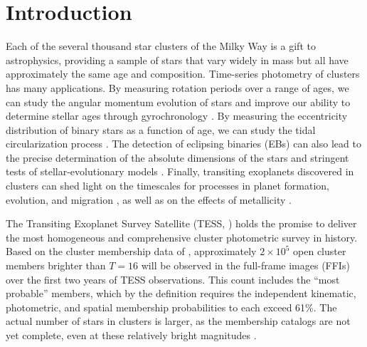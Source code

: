 \documentclass[12pt,twocolumn,tighten]{aastex62}
\begin{document}



\section{Introduction}
\label{sec:intro}

Each of the several thousand star clusters of the Milky Way is a gift
to astrophysics, providing a sample of stars that vary widely in mass
but all have approximately the same age and composition.  Time-series
photometry of clusters has many applications. By measuring rotation
periods over a range of ages, we can study the angular momentum
evolution of stars and improve our ability to determine stellar ages
through gyrochronology \citep[{\it
e.g.},][]{skumanich_time_1972,barnes_color-period_2015,meibom_spin-down_2015,curtis_tess_2019}.
By measuring the eccentricity distribution of binary stars as a
function of age, we can study the tidal circularization process
\citep{meibom_robust_2005,milliman_wiyn_2014,price-whelan_binary_2018}.
The detection of eclipsing binaries (EBs) can also lead to the precise
determination of the absolute dimensions of the stars and stringent
tests of stellar-evolutionary models
\citep{luhman_formation_2012,stassun_review_2014,kraus_mass-radius_2015}.
Finally, transiting exoplanets discovered in clusters can shed light
on the timescales for processes in planet formation, evolution, and
migration
\citep[][]{Fortney_et_al_2007,Mann_K2_33b_2016,David_et_al_2017}, as
well as on the effects of metallicity
\citep[][]{fischer_planet-metallicity_2005,petigura_metallicity_2018}.

The Transiting Exoplanet Survey Satellite (TESS,
\citealt{ricker_transiting_2015}) holds the promise to deliver the
most homogeneous and comprehensive cluster photometric survey in
history.  Based on the cluster membership data of
\citet{Kharchenko_et_al_2013}, approximately $2\times10^5$ open
cluster members brighter than $T=16$ will be observed in the
full-frame images (FFIs) over the first two years of TESS
observations.  This count includes the ``most probable'' members,
which by the \citet{kharchenko_global_2012} definition requires the
independent kinematic, photometric, and spatial membership
probabilities to each exceed 61\%.  The actual number of stars in
clusters is larger, as the membership catalogs are not yet complete,
even at these relatively bright magnitudes \citep[{\it
e.g.},][]{roser_nine_RSG_2016,cantat-gaudin_gaia_2018,cantat-gaudin_newOCs_2019,kounkel_untangling_2019,sim_open_2019}.
\end{document}
